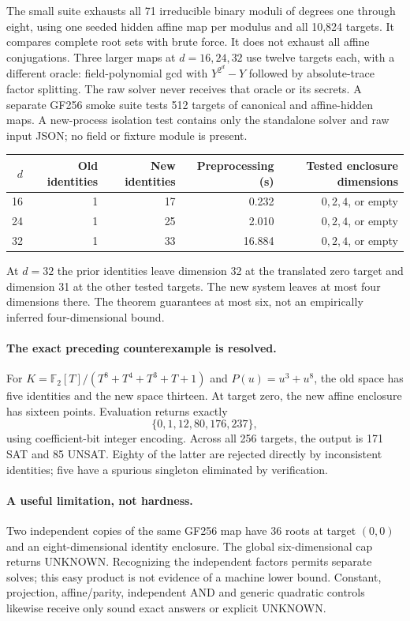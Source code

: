 \documentclass[11pt]{article}
\newcommand{\F}{\mathbb F_2}
\begin{document}
The small suite exhausts all 71 irreducible binary moduli of degrees one
through eight, using one seeded hidden affine map per modulus and all 10,824
targets. It compares complete root sets with brute force. It does not exhaust
all affine conjugations. Three larger maps at $d=16,24,32$ use twelve targets
each, with a different oracle: field-polynomial gcd with $Y^{2^d}-Y$ followed
by absolute-trace factor splitting. The raw solver never receives that oracle
or its secrets. A separate GF256 smoke suite tests 512 targets of canonical
and affine-hidden maps. A new-process isolation test contains only the
standalone solver and raw input JSON; no field or fixture module is present.

\begin{center}
\begin{tabular}{rrrrr}\toprule
$d$ & Old identities & New identities & Preprocessing (s) & Tested enclosure dimensions\\\midrule
16 & 1 & 17 & 0.232 & $0,2,4$, or empty\\
24 & 1 & 25 & 2.010 & $0,2,4$, or empty\\
32 & 1 & 33 & 16.884 & $0,2,4$, or empty\\\bottomrule
\end{tabular}
\end{center}
At $d=32$ the prior identities leave dimension 32 at the translated zero
target and dimension 31 at the other tested targets. The new system leaves
at most four dimensions there. The theorem guarantees at most six, not an
empirically inferred four-dimensional bound.

\paragraph{The exact preceding counterexample is resolved.}
For $K=\F[T]/(T^8+T^4+T^3+T+1)$ and $P(u)=u^3+u^8$, the old space has five
identities and the new space thirteen. At target zero, the new affine
enclosure has sixteen points. Evaluation returns exactly
\[
 \{0,1,12,80,176,237\},                                  \tag{9}
\]
using coefficient-bit integer encoding. Across all 256 targets, the output is
171 SAT and 85 UNSAT. Eighty of the latter are rejected directly by inconsistent
identities; five have a spurious singleton eliminated by verification.

\paragraph{A useful limitation, not hardness.}
Two independent copies of the same GF256 map have 36 roots at target $(0,0)$
and an eight-dimensional identity enclosure. The global six-dimensional cap
returns UNKNOWN. Recognizing the independent factors permits separate solves;
this easy product is not evidence of a machine lower bound. Constant,
projection, affine/parity, independent AND and generic quadratic controls
likewise receive only sound exact answers or explicit UNKNOWN.
\end{document}

